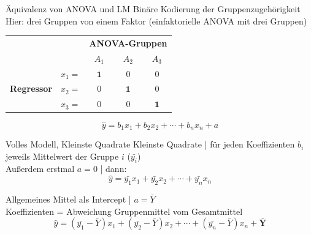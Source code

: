 \begin{frame}
  {Äquivalenz von ANOVA und LM}
  Binäre Kodierung der Gruppenzugehörigkeit\\
  Hier: drei Gruppen von einem Faktor (einfaktorielle ANOVA mit drei Gruppen)\\

 \begin{center}
   \begin{tabular}[h!]{|c|c|c|c|c|}
     \cline{3-5}
     \multicolumn{2}{c|}{} & \multicolumn{3}{c|}{\textbf{ANOVA-Gruppen}} \\
     \cline{3-5}
     \multicolumn{2}{c|}{} & $A_1$ & $A_2$ & $A_3$ \\
     \hline
     \multirow{3}{*}{\begin{sideways}\textbf{Regressor}\end{sideways}} & \rule{0pt}{18pt} $x_1=$ & $\mathbf{1}$ & $0$ & $0$ \\
     \cline{2-5}
     & \rule{0pt}{18pt} $x_2=$ & $0$ & $\mathbf{1}$ & $0$ \\
     \cline{2-5}
     & \rule{0pt}{18pt} $x_3=$ & $0$ & $0$ & $\mathbf{1}$ \\
     \hline
   \end{tabular}
  \Zeile
   \begin{equation}
    \hat{y}=b_1x_1 + b_2x_2 + \cdots + b_nx_n + a
  \end{equation}
 \end{center}
\end{frame}


\begin{frame}
  {Volles Modell, Kleinste Quadrate}
  Kleinste Quadrate | für jeden Koeffizienten $b_i$ jeweils Mittelwert der Gruppe $i$ ($\bar{y_i}$)\\
  Außerdem erstmal $a=0$ | dann:\\
  \Halbzeile 
  \begin{equation}
    \hat{y}=\bar{y_1}x_1 + \bar{y_2}x_2 + \cdots + \bar{y_n}x_n
  \end{equation}

  \Zeile
  Allgemeines Mittel als Intercept | $a=\bar{Y}$\\
  Koeffizienten = Abweichung Gruppenmittel vom Gesamtmittel\\
  \Halbzeile  
  \begin{equation}
    \hat{y}=(\bar{y_1}-\bar{Y})x_1 + (\bar{y_2}-\bar{Y})x_2 + \cdots + (\bar{y_n}-\bar{Y})x_n + \mathbf{\bar{Y}}
  \end{equation}
\end{frame}


